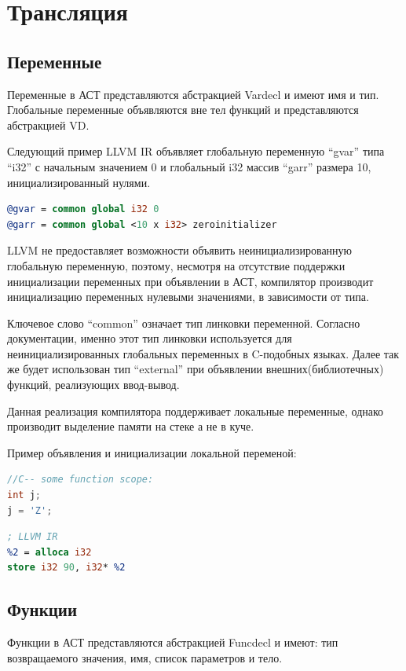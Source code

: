 \documentclass[a4paper,12pt]{report}
\numberwithin{equation}{section}
\begin{document}
\section{Трансляция}
\subsection{Переменные}
Переменные в АСТ представляются абстракцией Vardecl и имеют имя и тип. Глобальные переменные объявляются вне тел функций и представляются абстракцией VD.


Следующий пример LLVM IR объявляет глобальную переменную ``gvar'' типа ``i32'' с начальным значением 0 и глобальный i32 массив ``garr'' размера 10, инициализированный нулями.
\begin{lstlisting}[language=llvm]
@gvar = common global i32 0
@garr = common global <10 x i32> zeroinitializer
\end{lstlisting}
LLVM не предоставляет возможности объявить неинициализированную глобальную переменную, поэтому, несмотря на отсутствие поддержки инициализации переменных при объявлении в АСТ, компилятор производит инициализацию переменных нулевыми значениями, в зависимости от типа.

Ключевое слово ``common'' означает тип линковки переменной. Согласно документации, именно этот тип линковки используется для неинициализированных глобальных переменных в C-подобных языках. Далее так же будет использован тип ``external'' при объявлении внешних(библиотечных) функций, реализующих ввод-вывод.


Данная реализация компилятора поддерживает локальные переменные, однако производит выделение памяти на стеке а не в куче.


Пример объявления и инициализации локальной переменой:

\begin{lstlisting}[language=C]
//C-- some function scope:
int j;
j = 'Z';
\end{lstlisting}

\begin{lstlisting}[language=llvm]
; LLVM IR
%2 = alloca i32
store i32 90, i32* %2
\end{lstlisting}

\subsection{Функции}
Функции в АСТ представляются абстракцией Funcdecl и имеют: тип возвращаемого значения, имя, список параметров и тело.
\end{document}
